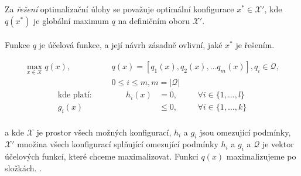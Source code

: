 \begin{definice}
  Za \textit{řešení} optimalizační úlohy se považuje optimální konfigurace $x^* \in \mathcal{X}'$,
  kde $q(x^*)$ je globální maximum $q$ na definičním oboru $\mathcal{X}'$.
  \\
  \\
  Funkce $q$ je účelová funkce, a její návrh zásadně ovlivní, jaké $x^*$ je řešením.
\end{definice}

\begin{definice}
  \begin{align}
    \max_{x \in \mathcal{X}} q(x), \hspace{50pt} &q(x) = [q_1(x), q_2(x), \dots q_{m}(x)], q_i \in \mathcal{Q}, \\
                                                 &0 \leq i \leq m, m = |\mathcal{Q}| 
  \end{align}
  \begin{align}
    \text{kde platí:} \hspace{50pt} h_i(x) &= 0, \hspace{20pt} &\forall i \in \{ 1, \dots, l \} \\
                     g_i(x) &\leq 0, \hspace{20pt} &\forall i \in \{ 1, \dots, k \}
  \end{align}
  \\
  a kde $\mathcal{X}$ je prostor všech možných konfigurací, $h_i$ a $g_i$ jsou omezující podmínky,
  $\mathcal{X}'$ množina všech konfigurací splňující omezující podmínky $h_i$ a $g_i$
  a $\mathcal{Q}$ je vektor účelových funkcí, které chceme maximalizovat.
  Funkci $q(x)$ maximalizujeme po složkách.
  .
\end{definice}

